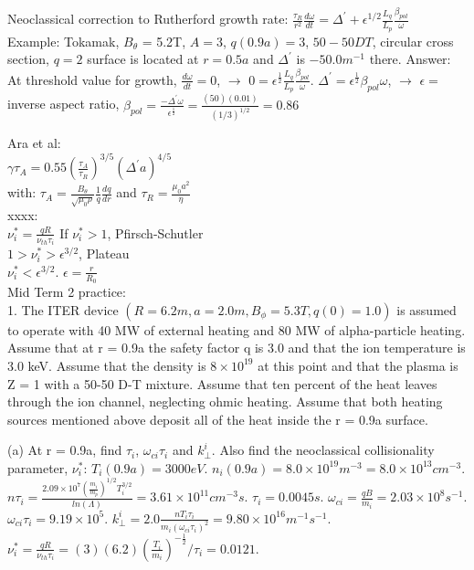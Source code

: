 \documentclass{article}
\begin{document}
\begin{multicols}{3}
Neoclassical correction to Rutherford growth rate:
$\frac{\tau_{R}}{r^{2}} \frac{d\omega}{dt} = \Delta ^{\prime} + \epsilon^{1/2}\frac{L_{q}}{L_{p}}\frac{\beta_{pol}}{\omega}$\\
Example: Tokamak, $B_{\theta}$ = 5.2T, $A = 3$, $q(0.9a) = 3$, $50-50DT$, circular cross section, $q=2$ surface is located at $r = 0.5a$ and $\Delta^{\prime}$ is $-50.0 m^{-1}$ there.  Answer:  At threshold value for growth, $\frac{d\omega}{dt} = 0$, $\rightarrow$  $0 = \epsilon^{\frac{1}{2}} \frac{L_{q}}{L_{p}}\frac{\beta_{pol}}{\omega}$.  $\Delta^{\prime} = \epsilon^{\frac{1}{2}} \beta_{pol} \omega$, $\rightarrow$ $\epsilon =$ inverse aspect ratio, $\beta_{pol} = \frac{-\Delta^{\prime}\omega}{\epsilon^{\frac{1}{2}}} = \frac{(50)(0.01)}{(1/3)^{1/2}} = 0.86$


Ara et al:\\
$\gamma \tau_{A} = 0.55 (\frac{\tau_{A}}{\tau_{R}})^{3/5}(\Delta^{\prime}a)^{4/5}$\\
with: $\tau_{A} = \frac{B_{\theta}}{\sqrt{\mu_{0}\rho}}\frac{1}{q}\frac{dq}{dr}$
 and $\tau_{R} = \frac{\mu_{0}a^{2}}{\eta}$\\
 
 xxxx:\\
 $\nu_{i}^{*} = \frac{qR}{\nu_{th}\tau_{i}}$
 If $\nu_{i}^{*} > 1$, Pfirsch-Schutler\\
 $1 > \nu_{i}^{*} > \epsilon^{3/2}$, Plateau\\
 $\nu_{i}^{*} < \epsilon^{3/2}$.
 $\epsilon = \frac{r}{R_{0}}$\\ 
 
 Mid Term 2 practice:\\
 1.  The ITER device $(R=6.2m,a=2.0m,B_{\phi} = 5.3T,q(0)=1.0)$ is assumed to operate with 40 MW of external heating and 80 MW of alpha-particle heating. Assume that at r = 0.9a the safety factor q is 3.0 and that the ion temperature is 3.0 keV.  Assume that the density is $8\times 10^{19}$ at this point and that the plasma is Z = 1 with a 50-50 D-T mixture.  Assume that ten percent of the heat leaves through the ion channel, neglecting ohmic heating.  Assume that both heating sources mentioned above deposit all of the heat inside the r = 0.9a surface. 
 
 (a) At r = 0.9a, find $\tau_{i}$, $\omega_{ci}\tau_{i}$ and $k_{\perp}^{i}$.  Also find the neoclassical collisionality parameter, $\nu_{i}^{*}$:  $T_{i}(0.9a) = 3000eV$.  $n_{i}(0.9a) = 8.0\times 10^{19} m^{-3} = 8.0\times 10^{13} cm^{-3}$.  $n\tau_{i} = \frac{2.09\times 10^{7}(\frac{m_{i}}{m_{p}})^{1/2}T^{3/2}_{i}}{ln(\Lambda)} = 3.61\times 10^{11} cm^{-3} s$.  $\tau_{i} = 0.0045 s$.  $\omega_{ci} = \frac{qB}{m_{i}} = 2.03 \times 10^{8}s^{-1}$. $\omega_{ci}\tau_{i} = 9.19\times 10^{5}$.  $k_{\perp}^{i} = 2.0 \frac{nT_{i}\tau_{i}}{m_{i}(\omega_{ci}\tau_{i})^{2}} = 9.80 \times 10^{16} m^{-1}s^{-1}$.  $\nu_{i}^{*} = \frac{qR}{\nu_{th}\tau_{i}} = (3)(6.2)(\frac{T_{i}}{m_{i}})^{-\frac{1}{2}} / \tau_{i} = 0.0121$.  
 

\end{multicols}
\end{document}
